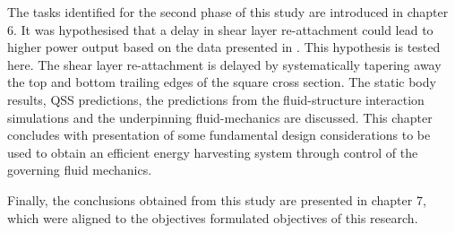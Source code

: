The tasks identified for the second phase of this study are introduced in chapter 6. It was hypothesised that a delay in shear layer re-attachment could lead to higher power output based on the data presented in \citet{Luo1994}. This hypothesis is tested here. The shear layer re-attachment is delayed by systematically tapering away the top and bottom trailing edges of the square cross section. The static body results, QSS predictions, the predictions from the fluid-structure interaction simulations and the underpinning fluid-mechanics are discussed. This chapter concludes with presentation of some fundamental design considerations to be used to obtain an efficient energy harvesting system through control of the governing fluid mechanics.

Finally, the conclusions obtained from this study are presented in chapter 7, which were aligned to the objectives formulated objectives of this research.

      









